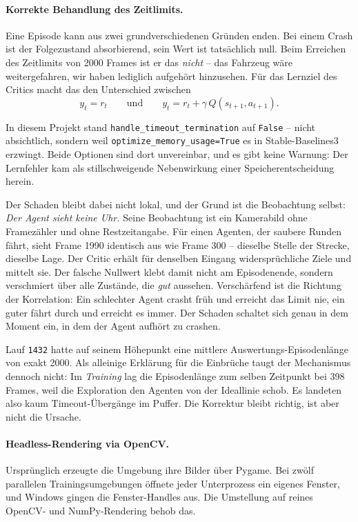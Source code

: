 \paragraph{Korrekte Behandlung des Zeitlimits.}
Eine Episode kann aus zwei grundverschiedenen Gründen enden. Bei einem Crash ist der Folgezustand absorbierend, sein Wert ist tatsächlich null. Beim Erreichen des Zeitlimits von \num{2000} Frames ist er das \emph{nicht} -- das Fahrzeug wäre weitergefahren, wir haben lediglich aufgehört hinzusehen. Für das Lernziel des Critics macht das den Unterschied zwischen
\begin{equation}
  y_t = r_t \qquad \text{und} \qquad y_t = r_t + \gamma\, Q(s_{t+1}, a_{t+1}).
  \label{eq:bootstrapping}
\end{equation}

In diesem Projekt stand \texttt{handle\_timeout\_termination} auf \texttt{False} -- nicht absichtlich, sondern weil \texttt{optimize\_memory\_usage=True} es in Stable-Baselines3 erzwingt. Beide Optionen sind dort unvereinbar, und es gibt keine Warnung: Der Lernfehler kam als stillschweigende Nebenwirkung einer Speicherentscheidung herein.

Der Schaden bleibt dabei nicht lokal, und der Grund ist die Beobachtung selbst: \emph{Der Agent sieht keine Uhr.} Seine Beobachtung ist ein Kamerabild ohne Framezähler und ohne Restzeitangabe. Für einen Agenten, der saubere Runden fährt, sieht Frame \num{1990} identisch aus wie Frame \num{300} -- dieselbe Stelle der Strecke, dieselbe Lage. Der Critic erhält für denselben Eingang widersprüchliche Ziele und mittelt sie. Der falsche Nullwert klebt damit nicht am Episodenende, sondern verschmiert über alle Zustände, die \emph{gut} aussehen. Verschärfend ist die Richtung der Korrelation: Ein schlechter Agent crasht früh und erreicht das Limit nie, ein guter fährt durch und erreicht es immer. Der Schaden schaltet sich genau in dem Moment ein, in dem der Agent aufhört zu crashen.

Lauf \texttt{1432} hatte auf seinem Höhepunkt eine mittlere Auswertungs-Episodenlänge von exakt \num{2000}. Als alleinige Erklärung für die Einbrüche taugt der Mechanismus dennoch nicht: Im \emph{Training} lag die Episodenlänge zum selben Zeitpunkt bei \num{398} Frames, weil die Exploration den Agenten von der Ideallinie schob. Es landeten also kaum Timeout-Übergänge im Puffer. Die Korrektur bleibt richtig, ist aber nicht die Ursache.

\paragraph{Headless-Rendering via OpenCV.}
Ursprünglich erzeugte die Umgebung ihre Bilder über Pygame. Bei zwölf parallelen Trainingsumgebungen öffnete jeder Unterprozess ein eigenes Fenster, und Windows gingen die Fenster-Handles aus. Die Umstellung auf reines OpenCV- und NumPy-Rendering behob das.

